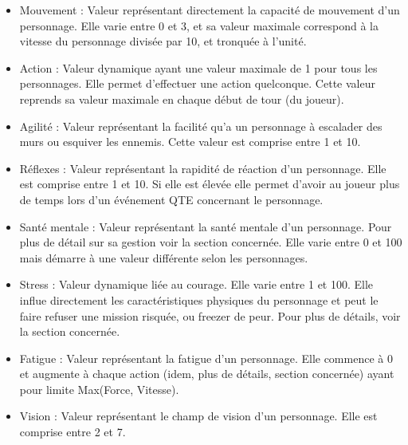 \begin{itemize}
  \item Mouvement : Valeur représentant directement la capacité de mouvement d'un personnage. Elle varie entre 0 et 3, et sa valeur maximale correspond à la vitesse du personnage divisée par 10, et tronquée à l'unité.
  \item Action : Valeur dynamique ayant une valeur maximale de 1 pour tous les personnages. Elle permet d'effectuer une action quelconque. Cette valeur reprends sa valeur maximale en chaque début de tour (du joueur).
  \item Agilité : Valeur représentant la facilité qu'a un personnage à escalader des murs ou esquiver les ennemis. Cette valeur est comprise entre 1 et 10.
  \item Réflexes : Valeur représentant la rapidité de réaction d'un personnage. Elle est comprise entre 1 et 10. Si elle est élevée elle permet d'avoir au joueur plus de temps lors d'un événement QTE concernant le personnage.
  \item Santé mentale : Valeur représentant la santé mentale d'un personnage. Pour plus de détail sur sa gestion voir la section concernée. Elle varie entre 0 et 100 mais démarre à une valeur différente selon les personnages.
  \item Stress : Valeur dynamique liée au courage. Elle varie entre 1 et 100. Elle influe directement les caractéristiques physiques du personnage et peut le faire refuser une mission risquée, ou freezer de peur. Pour plus de détails, voir la section concernée.
  \item Fatigue : Valeur représentant la fatigue d'un personnage. Elle commence à 0 et augmente à chaque action (idem, plus de détails, section concernée) ayant pour limite Max(Force, Vitesse).
  \item Vision : Valeur représentant le champ de vision d'un personnage. Elle est comprise entre 2 et 7.
\end{itemize}

